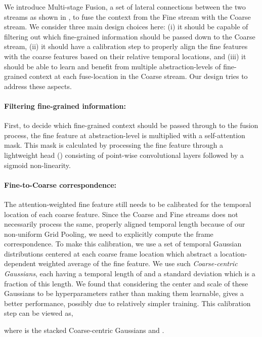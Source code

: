 \documentclass[final]{cvpr}
\begin{document}
We introduce Multi-stage Fusion, a set of lateral connections between the two streams as shown in , to fuse the context from the Fine stream with the Coarse stream. We consider three main design choices here: (i) it should be capable of filtering out which fine-grained information should be passed down to the Coarse stream, (ii) it should have a calibration step to properly align the fine features with the coarse features based on their relative temporal locations, and (iii) it should be able to learn and benefit from multiple abstraction-levels of fine-grained context at each fuse-location in the Coarse stream. Our design tries to address these aspects.

\paragraph{Filtering fine-grained information:} First, to decide which fine-grained context should be passed through to the fusion process, the fine feature  at abstraction-level  is multiplied with a self-attention mask. This mask is calculated by processing the fine feature through a lightweight head () consisting of point-wise convolutional layers followed by a sigmoid non-linearity. 


\paragraph{Fine-to-Coarse correspondence:} The attention-weighted fine feature  still needs to be calibrated for the temporal location of each coarse feature. Since the Coarse and Fine streams does not necessarily process the same, properly aligned temporal length because of our non-uniform Grid Pooling, 
we need to explicitly compute the frame correspondence. 
To make this calibration, we use a set of temporal Gaussian distributions centered at each coarse frame location  which abstract a location-dependent weighted average of the fine feature. We use  such \textit{Coarse-centric Gaussians}, each having a temporal length of  and a standard deviation  which is a fraction of this length.
We found that considering the center and scale of these Gaussians to be hyperparameters rather than making them learnable, gives a better performance, possibly due to relatively simpler training. This calibration step can be viewed as,\vspace{-2mm}

where  is the stacked Coarse-centric Gaussians and .
\end{document}
